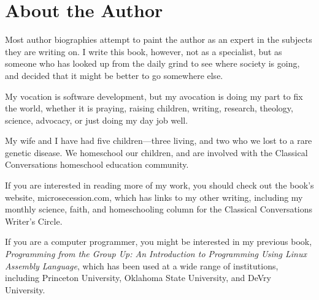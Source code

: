 \chapter*{About the Author}

Most author biographies attempt to paint the author as an expert in 
the subjects they are writing on.  I write this book, however, not
as a specialist, but as someone who has looked up from the daily grind
to see where society is going, and decided that it might be better to 
go somewhere else.  

My vocation is software development, but my avocation is doing my part
to fix the world, whether it is praying, raising children, writing, research,
theology, science, advocacy, or just doing my day job well.

My wife and I have had five children---three living, and two who we lost
to a rare genetic disease.  We homeschool our children, and are involved
with the Classical Conversations homeschool education community.

If you are interested in reading more of my work, you should check out
the book's website, microsecession.com, which has links to my other
writing, including my monthly science, faith, and homeschooling column 
for the Classical Conversations Writer's Circle.

If you are a computer
programmer, you might be interested in my previous book,
\textit{Programming from the Group Up: An Introduction to Programming
Using Linux Assembly Language}, which has been used at a wide range
of institutions, including Princeton University, Oklahoma State University, 
and DeVry University.
